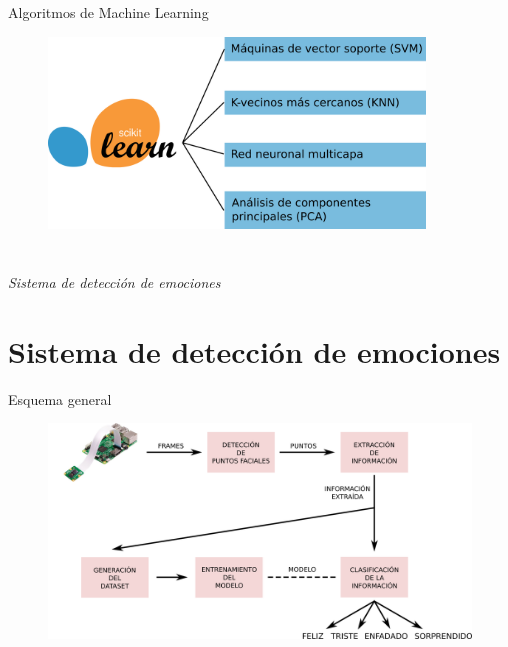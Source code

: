 \documentclass{beamer}
\begin{document}
\begin{frame}{Algoritmos de Machine Learning}
\begin{figure}
    \begin{center}
        \includegraphics[width=10cm]{figs/algoritmosML.png}
    \end{center}
\end{figure}
\end{frame}

\section*{}
\begin{frame}{}
  \centering \Huge
  \emph{Sistema de detección de emociones}
\end{frame}

\section{Sistema de detección de emociones}
\begin{frame}{Esquema general}
\begin{figure}
    \begin{center}
        \includegraphics[width=12cm]{figs/metodo_sin_secciones.png}
    \end{center}
\end{figure}
\end{frame}
\end{document}
